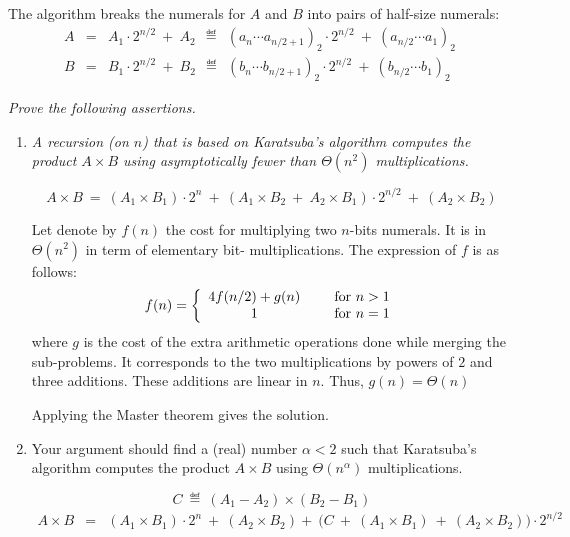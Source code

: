 \begin{itemize}
The algorithm breaks the numerals for $A$ and $B$ into pairs of half-size numerals:
\begin{eqnarray*}
A & = & A_1 \cdot 2^{n/2} \ + \ A_2 \ \ 
 \eqdef  \ \ (a_n \cdots a_{n/2+1})_2 \cdot 2^{n/2} \ + \ (a_{n/2} \cdots a_1)_2 \\
B & = & B_1 \cdot 2^{n/2} \ + \  B_2 \ \
  \eqdef  \ \ (b_n \cdots b_{n/2+1})_2 \cdot 2^{n/2} \ + \ (b_{n/2} \cdots b_1)_2
\end{eqnarray*}

{\em Prove the following assertions.}
\begin{enumerate}
\item 
{\em A recursion (on $n$) that is based on Karatsuba's algorithm computes the product $A \times B$ using {\em asymptotically fewer than} $\Theta(n^2)$ multiplications.}

\begin{equation}
\label{eq:karatsuba-normal}
A \times B \ = \ (A_1 \times B_1) \cdot 2^n \ + \  (A_1 \times B_2 \ + \ A_2 \times B_1) \cdot 2^{n/2} \ + \ (A_2 \times B_2)
\end{equation}

Let denote by $f(n)$ the cost for multiplying two $n$-bits numerals.
It is in $\Theta(n^2)$ in term of elementary bit- multiplications. 
The expression of $f$ is as follows:
\[
f(n) = \left\{
\begin{array}{cl}
4 f(n/2) + g(n) & \hspace*{.2in} \mbox{for } n > 1 \\
                    1 & \hspace*{.2in} \mbox{for } n = 1
\end{array}
\right. 
\]
where $g$ is the cost of the extra arithmetic operations done while merging the sub-problems. 
It corresponds to the two multiplications by powers of $2$ and three additions.
These additions are linear in $n$. Thus, $g(n) = \Theta(n)$

Applying the Master theorem gives the solution. 

\medskip
\item
Your argument should find a (real) number $\alpha < 2$ such that Karatsuba's algorithm computes the product $A \times B$ using $\Theta(n^\alpha)$ multiplications.
\smallskip

\[ C \ \eqdef \ (A_1 - A_2) \times (B_2 - B_1) \]
\begin{eqnarray*}
A \times B & = & (A_1 \times B_1) \cdot 2^n \ + \ (A_2 \times B_2) + \ \big(C \ + \ (A_1 \times B_1) \ + \ (A_2 \times B_2) \big) \cdot 2^{n/2}
\end{eqnarray*}


\end{enumerate}
\end{itemize}
